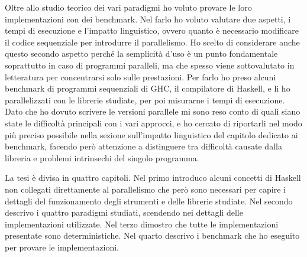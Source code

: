 Oltre allo studio teorico dei vari paradigmi ho voluto provare le loro implementazioni con dei benchmark. Nel farlo ho voluto valutare due aspetti, i tempi di esecuzione e l'impatto linguistico, ovvero quanto è necessario modificare il codice sequenziale per introdurre il parallelismo. Ho scelto di considerare anche questo secondo aspetto perché la semplicità d'uso è un punto fondamentale soprattutto in caso di programmi paralleli, ma che spesso viene sottovalutato in letteratura per concentrarsi solo sulle prestazioni. Per farlo ho preso alcuni benchmark di programmi sequenziali di GHC, il compilatore di Haskell, e li ho parallelizzati con le librerie studiate, per poi misurarne i tempi di esecuzione. Dato che ho dovuto scrivere le versioni parallele mi sono reso conto di quali siano state le difficoltà principali con i vari approcci, e ho cercato di riportarli nel modo più preciso possibile nella sezione sull'impatto linguistico del capitolo dedicato ai benchmark, facendo però attenzione a distinguere tra difficoltà causate dalla libreria e problemi intrinsechi del singolo programma.

La tesi è divisa in quattro capitoli.
Nel primo introduco alcuni concetti di Haskell non collegati direttamente al parallelismo che però sono necessari per capire i dettagli del funzionamento degli strumenti e delle librerie studiate.
Nel secondo descrivo i quattro paradigmi studiati, scendendo nei dettagli delle implementazioni utilizzate.
Nel terzo dimostro che tutte le implementazioni presentate sono deterministiche.
Nel quarto descrivo i benchmark che ho eseguito per provare le implementazioni.

